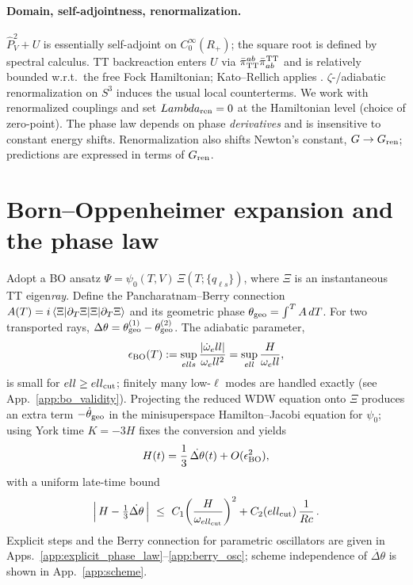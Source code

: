 \documentclass[aps,prd,twocolumn,amsmath,amssymb,nofootinbib,superscriptaddress]{revtex4-2}
\def\mathbb#1{#1}%
\def\mathcal#1{#1}%
\def\Rc{Rc}%
\def\Lambda{Lambda}%
\newcommand{\Rc}{\mathcal{R}_c}
\newcommand{\cU}{\mathcal{U}}
\begin{document}
\paragraph*{Domain, self-adjointness, renormalization.}
$\hat P_V^2+\cU$ is essentially self-adjoint on $C_0^\infty(\mathbb{R}_+)$; the square root is defined by spectral calculus. TT backreaction enters $\cU$ via $\bar\pi^{ab}_{\rm TT}\bar\pi^{\rm TT}_{ab}$ and is relatively bounded w.r.t.\ the free Fock Hamiltonian; Kato--Rellich applies \cite{Kato1966}. $\zeta$-/adiabatic renormalization on $S^3$ induces the usual local counterterms. We work with renormalized couplings and set $\Lambda_{\rm ren}=0$ at the Hamiltonian level (choice of zero-point). The phase law depends on phase \emph{derivatives} and is insensitive to constant energy shifts. Renormalization also shifts Newton's constant, $G\to G_{\rm ren}$; predictions are expressed in terms of $G_{\rm ren}$.

\section{Born--Oppenheimer expansion and the phase law}
Adopt a BO ansatz $\Psi=\psi_0(T,V)\,\Xi(T;\{q_{\ell s}\})$, where $\Xi$ is an instantaneous TT eigen\emph{ray}. Define the Pancharatnam--Berry connection $\mathcal{A}(T)=i\braket{\Xi|\partial_T\Xi}$ and its geometric phase $\theta_{\rm geo}=\int^T \mathcal{A}\,dT$. For two transported rays, $\Delta\theta=\theta_{\rm geo}^{(1)}-\theta_{\rm geo}^{(2)}$. The adiabatic parameter,
\begin{equation}
\epsilon_{\rm BO}(T):=\sup_{\ell s}\frac{|\dot\omega_\ell|}{\omega_\ell^2}
=\sup_{\ell}\frac{H}{\omega_\ell},
\end{equation}
is small for $\ell\ge \ell_{\rm cut}$; finitely many low-$\ell$ modes are handled exactly (see App.~\ref{app:bo_validity}). Projecting the reduced WDW equation onto $\Xi$ produces an extra term $-\dot{\theta}_{\rm geo}$ in the minisuperspace Hamilton--Jacobi equation for $\psi_0$; using York time $K=-3H$ fixes the conversion and yields
\begin{equation}\label{eq:Hlaw}
H(t)=\frac{1}{3}\,\dot{\Delta\theta}(t)+\mathcal{O}(\epsilon_{\rm BO}^2),
\end{equation}
with a uniform late-time bound
\begin{equation}
\Big|\,H-\tfrac{1}{3}\dot{\Delta\theta}\,\Big|\ \le\ C_1\!\left(\frac{H}{\omega_{\ell_{\rm cut}}}\right)^2 + C_2(\ell_{\rm cut})\,\frac{1}{\Rc}\,.
\end{equation}
Explicit steps and the Berry connection for parametric oscillators are given in Apps.~\ref{app:explicit_phase_law}--\ref{app:berry_osc}; scheme independence of $\dot{\Delta\theta}$ is shown in App.~\ref{app:scheme}.
\end{document}

